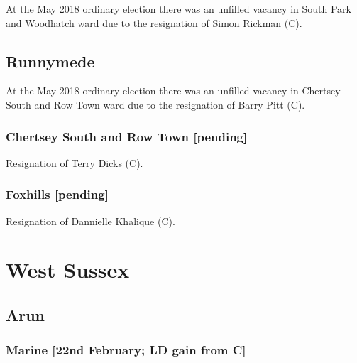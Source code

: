 \documentclass[a4paper,openany]{book}
\begin{document}
\begin{resultsiii}
At the May 2018 ordinary election there was an unfilled vacancy in South Park and Woodhatch ward due to the resignation of Simon Rickman (C).

\subsection*{Runnymede}

At the May 2018 ordinary election there was an unfilled vacancy in Chertsey South and Row Town ward due to the resignation of Barry Pitt (C).

\subsubsection*{Chertsey South and Row Town \hspace*{\fill}\nolinebreak[1]%
\enspace\hspace*{\fill}
[pending]}


Resignation of Terry Dicks (C).

\subsubsection*{Foxhills \hspace*{\fill}\nolinebreak[1]%
\enspace\hspace*{\fill}
[pending]}


Resignation of Dannielle Khalique (C).

\section{West Sussex}

\subsection*{Arun}

\subsubsection*{Marine \hspace*{\fill}\nolinebreak[1]%
\enspace\hspace*{\fill}
[22nd February; LD gain from C]}


\end{resultsiii}
\end{document}
